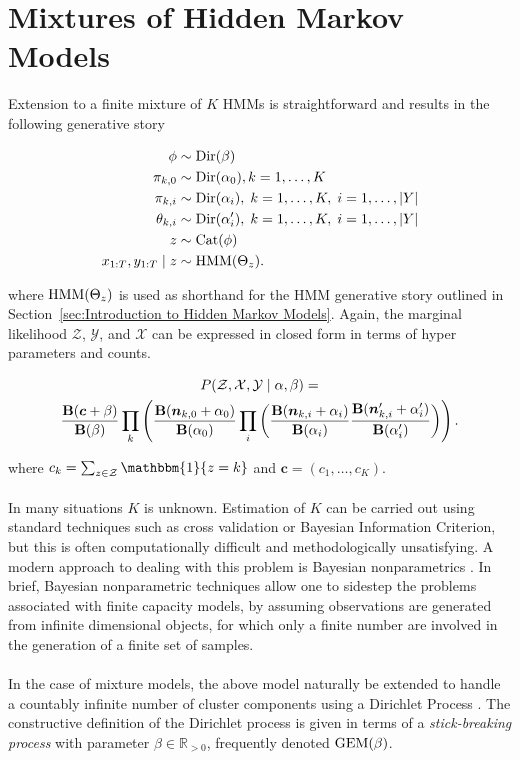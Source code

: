 \documentclass[12pt]{report}
\newcommand{\p}[0]{\prime}
\newcommand{\1}[0]{\mathbbm{1}}
\newcommand{\Cat}[0]{\textnormal{Cat}}
\newcommand{\Dir}[0]{\textnormal{Dir}}
\newcommand{\GEM}[0]{\textnormal{GEM}}
\newcommand{\HMM}[0]{\textnormal{HMM}}
\newcommand{\Bf}[0]{\text{\textbf{B}}}
\newcommand{\seq}[3]{\ensuremath{#1_{{#2}:{#3}}}}
\DeclarePairedDelimiter\abs{\lvert}{\rvert}%
\begin{document}
\section{Mixtures of Hidden Markov Models}
\label{sec:Mixtures of Hidden Markov Models}
Extension to a finite mixture of $K$ \acp{HMM} is straightforward and results
in the following generative story

\begin{align*}
    \phi & \sim \Dir(\beta) \\
    \pi_{k,0} & \sim \Dir(\alpha_0), k=1,\ldots,K \\
    \pi_{k,i} & \sim \Dir(\alpha_i),\; k=1,\ldots,K,\; i=1,\ldots,\abs{Y} \\
    \theta_{k,i} & \sim \Dir(\alpha_i^\p),\; k=1,\ldots,K,\; i = 1,\ldots,\abs{Y} \\
    z & \sim \Cat(\phi) \\
    \seq{x}{1}{T}, \seq{y}{1}{T} \mid z & \sim \HMM(\Theta_z).
\end{align*}

where $\HMM(\Theta_z)$ is used as shorthand for the \ac{HMM}
generative story outlined in Section~\ref{sec:Introduction to Hidden Markov Models}.
Again, the marginal likelihood $\mathcal{Z}$, $\mathcal{Y}$, and $\mathcal{X}$ can be
expressed in closed form in terms of hyper parameters and counts.

\begin{multline}
    P(\mathcal{Z}, \mathcal{X}, \mathcal{Y} \mid \alpha, \beta) = \\
    \frac{\Bf(\bm{c} + \beta)}{\Bf(\beta)}
    \prod_k
    \left(
        \frac{\Bf(\bm{n}_{k,0} + \alpha_0)}{\Bf(\alpha_0)}
        \prod_i
        \left(
            \frac{\Bf(\bm{n}_{k,i} + \alpha_i)}{\Bf(\alpha_i)}
            \frac{\Bf(\bm{n}_{k,i}^\p + \alpha_i^\p)}{\Bf(\alpha_i^\p)}
        \right)
    \right). \label{eq:joint-marg-finite-mixture}
\end{multline}

where $c_k = \sum_{z \in \mathcal{Z}}\1\{z = k\}$ and $\bm{c} = (c_1, \ldots, c_K)$.
\\\\
In many situations $K$ is unknown. Estimation of $K$ can be carried out using standard
techniques such as cross validation or Bayesian Information Criterion, but this is
often computationally difficult and methodologically unsatisfying. A modern
approach to dealing with this problem is Bayesian nonparametrics \cite{jordan-bayesian-nonparam}.
In brief, Bayesian nonparametric techniques allow one to sidestep the problems associated with finite
capacity models, by assuming observations are generated from infinite dimensional objects,
for which only a finite number are involved in the generation of a finite set of samples.
\\\\
In the case of mixture models, the above model naturally be extended to handle a
countably infinite number of cluster components using a Dirichlet Process \cite{teh-dirichlet}.
The constructive definition of the Dirichlet process is given in terms of a
\emph{stick-breaking process} \cite{sethuraman-constructive} with parameter
$\beta \in \mathbb{R}_{>0}$, frequently denoted $\GEM(\beta)$.
\end{document}
